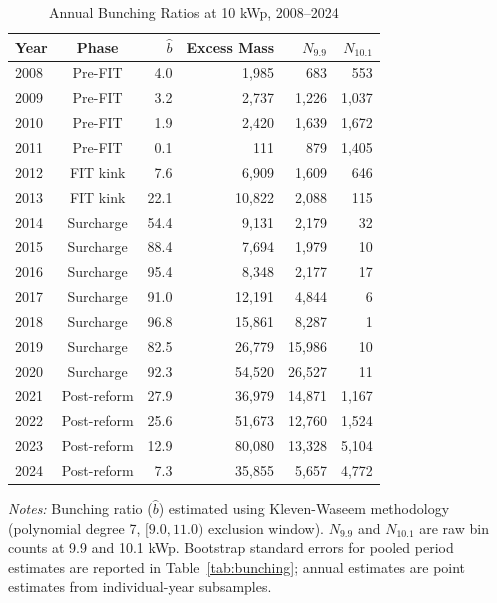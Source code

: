 \begin{table}[t]
\centering
\caption{Annual Bunching Ratios at 10 kWp, 2008--2024}
\label{tab:annual}
\begin{tabular}{lcrrrr}
\toprule
Year & Phase & $\hat{b}$ & Excess Mass & $N_{9.9}$ & $N_{10.1}$ \\
\midrule
2008 & Pre-FIT & 4.0 & 1,985 & 683 & 553 \\
2009 & Pre-FIT & 3.2 & 2,737 & 1,226 & 1,037 \\
2010 & Pre-FIT & 1.9 & 2,420 & 1,639 & 1,672 \\
2011 & Pre-FIT & 0.1 & 111 & 879 & 1,405 \\
\midrule
2012 & FIT kink & 7.6 & 6,909 & 1,609 & 646 \\
2013 & FIT kink & 22.1 & 10,822 & 2,088 & 115 \\
\midrule
2014 & Surcharge & 54.4 & 9,131 & 2,179 & 32 \\
2015 & Surcharge & 88.4 & 7,694 & 1,979 & 10 \\
2016 & Surcharge & 95.4 & 8,348 & 2,177 & 17 \\
2017 & Surcharge & 91.0 & 12,191 & 4,844 & 6 \\
2018 & Surcharge & 96.8 & 15,861 & 8,287 & 1 \\
2019 & Surcharge & 82.5 & 26,779 & 15,986 & 10 \\
2020 & Surcharge & 92.3 & 54,520 & 26,527 & 11 \\
\midrule
2021 & Post-reform & 27.9 & 36,979 & 14,871 & 1,167 \\
2022 & Post-reform & 25.6 & 51,673 & 12,760 & 1,524 \\
2023 & Post-reform & 12.9 & 80,080 & 13,328 & 5,104 \\
2024 & Post-reform & 7.3 & 35,855 & 5,657 & 4,772 \\
\bottomrule
\end{tabular}

\vspace{0.5em}
\begin{flushleft}\small \textit{Notes:} Bunching ratio ($\hat{b}$) estimated using Kleven-Waseem methodology (polynomial degree 7, $[9.0, 11.0)$ exclusion window). $N_{9.9}$ and $N_{10.1}$ are raw bin counts at 9.9 and 10.1 kWp. Bootstrap standard errors for pooled period estimates are reported in Table~\ref{tab:bunching}; annual estimates are point estimates from individual-year subsamples.\end{flushleft}
\end{table}
